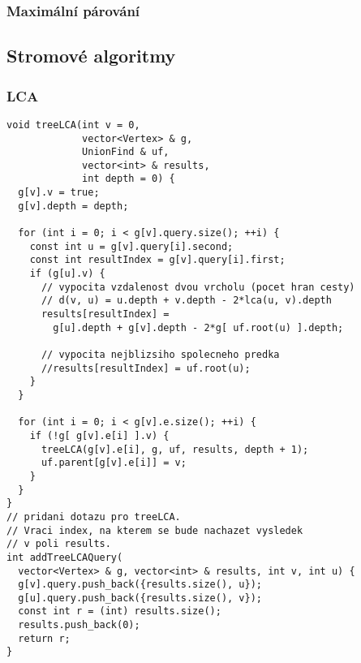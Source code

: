 \documentclass{article}
\begin{document}
\subsubsection{Maximální párování}


\subsection{Stromové algoritmy}
\subsubsection{LCA}
\begin{lstlisting}
void treeLCA(int v = 0, 
             vector<Vertex> & g,
             UnionFind & uf,
             vector<int> & results,
             int depth = 0) {
  g[v].v = true;
  g[v].depth = depth;

  for (int i = 0; i < g[v].query.size(); ++i) {
    const int u = g[v].query[i].second;
    const int resultIndex = g[v].query[i].first;
    if (g[u].v) {
      // vypocita vzdalenost dvou vrcholu (pocet hran cesty)
      // d(v, u) = u.depth + v.depth - 2*lca(u, v).depth
      results[resultIndex] = 
        g[u].depth + g[v].depth - 2*g[ uf.root(u) ].depth;

      // vypocita nejblizsiho spolecneho predka
      //results[resultIndex] = uf.root(u);
    }
  }

  for (int i = 0; i < g[v].e.size(); ++i) {
    if (!g[ g[v].e[i] ].v) {
      treeLCA(g[v].e[i], g, uf, results, depth + 1);
      uf.parent[g[v].e[i]] = v;
    }
  }
}
// pridani dotazu pro treeLCA. 
// Vraci index, na kterem se bude nachazet vysledek
// v poli results.
int addTreeLCAQuery(
  vector<Vertex> & g, vector<int> & results, int v, int u) {
  g[v].query.push_back({results.size(), u});
  g[u].query.push_back({results.size(), v});
  const int r = (int) results.size();
  results.push_back(0);
  return r;
}
\end{lstlisting}
\end{document}
